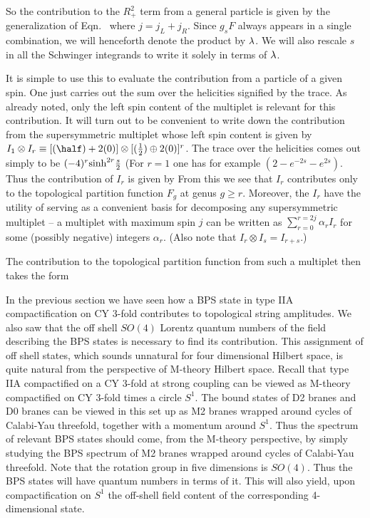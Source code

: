 So the contribution to the $R_+^2$ term from a general particle is given by
the generalization of Eqn.\schw\
%
\eqn{}
%
where $j=j_L+j_R$.
Since $g_sF$ always appears in a single combination, we will henceforth denote
the
product by $\lambda$. We will also rescale $s$ in all the Schwinger integrands
to write it solely in terms of $\lambda$.

It is simple to use this to
evaluate the contribution from a particle of a given spin. One just carries
out the sum over the helicities signified by the trace.
As already noted, only the left spin content of
the multiplet is relevant for this contribution.
It will turn out to be convenient to write down the contribution from the
supersymmetric multiplet whose left spin content is given by
$I_1\otimes I_r \equiv [(\half )+2(0)]\otimes
[({1\over 2})\oplus 2(0)]^r$. The
trace
over the helicities comes out simply to be $(-4)^r {\rm sinh}^{2r}{s\over 2}$
(For $r=1$
one has for example  $(2-e^{-2s}-e^{2s})$.
Thus the contribution of $I_r$ is given by
%
\eqn{}
%
{}From this we see that $I_r$ contributes only to the topological partition
function $F_g$ at genus $g\geq r$. Moreover, the $I_r$ have the
utility of serving as a convenient basis for decomposing any supersymmetric
multiplet -- a multiplet with maximum spin $j$ can be written as
$\sum_{r=0}^{r=2j}\alpha_rI_r$ for some (possibly negative)
 integers $\alpha_r$.  (Also note that
$I_r\otimes I_s=I_{r+s}$.)

The contribution to the topological partition function from such a
multiplet then takes the form
%
\eqn{}
%

In the previous section we have seen how a BPS state in type IIA
compactification on CY 3-fold
contributes to topological string amplitudes.  We also saw
that the off shell $SO(4)$ Lorentz quantum numbers of the
field describing the BPS states is
necessary to find its contribution.  This assignment
of off shell states, which sounds unnatural for four dimensional
Hilbert space, is quite natural from the perspective of M-theory
Hilbert space.
Recall that type IIA compactified on a CY 3-fold at strong coupling
can be viewed as M-theory compactified on CY 3-fold times a circle $S^1$.
The bound states of D2 branes and D0 branes can be viewed in this set up
as M2 branes wrapped around cycles of Calabi-Yau threefold, together with a
momentum around $S^1$. Thus the spectrum of relevant BPS states
should come, from the M-theory perspective, by simply studying
the BPS spectrum of M2 branes wrapped around cycles of
Calabi-Yau threefold.  Note that the rotation group in
five dimensions is $SO(4)$.  Thus the BPS states will have
quantum numbers in terms of it.  This will also yield, upon
compactification on $S^1$ the off-shell field content of the
corresponding 4-dimensional state.

